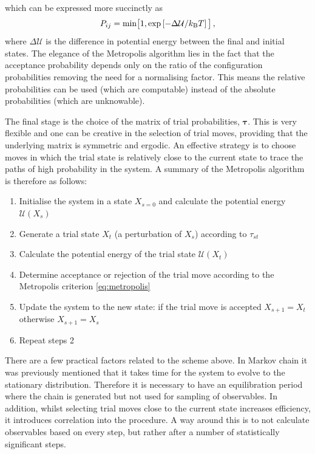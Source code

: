 which can be expressed more succinctly as
\begin{equation}
	\label{eq:metropolis}
	 P_{ij}=\text{min}\big[1,\exp\left[-\Delta \mathcal{U}/k_\text{B} T\right]\big]\,,
\end{equation}
where $\Delta \mathcal{U}$ is the difference in potential energy between the final and initial states.
The elegance of the Metropolis algorithm lies in the fact that the acceptance probability depends only on the ratio of the configuration probabilities removing the need for a normalising factor.
This means the relative probabilities can be used (which are computable) instead of the absolute probabilities (which are unknowable).

The final stage is the choice of the matrix of trial probabilities, $\bm{\tau}$. 
This is very flexible and one can be creative in the selection of trial moves, providing that the underlying matrix is symmetric and ergodic.
An effective strategy is to choose moves in which the trial state is relatively close to the current state to trace the paths of high probability in the system.
A summary of the Metropolis algorithm is therefore as follows:
\begin{enumerate}
	\item Initialise the system in a state $X_{s=0}$ and calculate the potential energy $\mathcal{U}\left(X_s\right)$
	\item Generate a trial state $X_t$ (a perturbation of $X_s$) according to $\tau_{st}$
	\item Calculate the potential energy of the trial state $\mathcal{U}\left(X_t\right)$
	\item Determine acceptance or rejection of the trial move according to the Metropolis criterion \eqref{eq:metropolis}
	\item Update the system to the new state: if the trial move is accepted $X_{s+1}=X_{t}$ otherwise $X_{s+1}=X_{s}$
	\item Repeat steps 2
\end{enumerate}
There are a few practical factors related to the scheme above.
In Markov chain \mc{} it was previously mentioned that it takes time for the system to evolve to the stationary distribution.
Therefore it is necessary to have an equilibration period where the chain is generated but not used for sampling of observables.
In addition, whilst selecting trial moves close to the current state increases efficiency, it introduces correlation into the procedure.
A way around this is to not calculate observables based on every step, but rather after a number of statistically significant steps.

